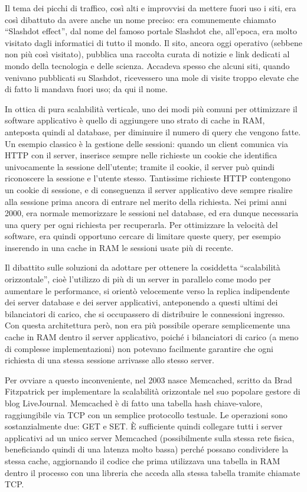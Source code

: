 Il tema dei picchi di traffico, così alti e improvvisi da mettere fuori uso i siti,
era così dibattuto da avere anche un nome preciso: era comunemente chiamato ``Slashdot
effect'', dal nome del famoso portale Slashdot che, all'epoca, era molto visitato dagli
informatici di tutto il mondo. Il sito, ancora oggi operativo (sebbene non più così
visitato), pubblica una raccolta curata di notizie e link dedicati al mondo della tecnologia
e delle scienza. Accadeva spesso che alcuni siti, quando venivano pubblicati su Slashdot,
ricevessero una mole di visite troppo elevate che di fatto li mandava fuori uso; da qui
il nome.

In ottica di pura scalabilità verticale, uno dei modi più comuni per ottimizzare il software
applicativo è quello di aggiungere uno strato di cache in RAM, anteposta quindi al database, per
diminuire il numero di query che vengono fatte. Un esempio classico è la gestione delle sessioni:
quando un client comunica via HTTP con il server, inserisce sempre nelle richieste un cookie che
identifica univocamente la sessione dell'utente; tramite il cookie, il server può quindi riconoscere
la sessione e l'utente stesso. Tantissime richieste HTTP contengono un cookie di sessione, e di
conseguenza il server applicativo deve sempre risalire alla sessione prima ancora di entrare nel
merito della richiesta. Nei primi anni 2000, era normale memorizzare le sessioni nel database, ed
era dunque necessaria una query per ogni richiesta per recuperarla. Per ottimizzare la velocità del
software, era quindi opportuno cercare di limitare queste query, per esempio inserendo in una cache
in RAM le sessioni usate più di recente.

Il dibattito sulle soluzioni da adottare per ottenere la cosiddetta ``scalabilità orizzontale'',
cioè l'utilizzo di più di un server in parallelo come modo per aumentare le performance, si orientò
velocemente verso la replica indipendente dei server database e dei server applicativi, anteponendo
a questi ultimi dei bilanciatori di carico, che si occupassero di distribuire le connessioni
ingresso. Con questa architettura però, non era più possibile operare semplicemente una cache in RAM
dentro il server applicativo, poiché i bilanciatori di carico (a meno di complesse implementazioni)
non potevano facilmente garantire che ogni richiesta di una stessa sessione arrivasse allo stesso
server.

Per ovviare a questo inconveniente, nel 2003 nasce Memcached, scritto da Brad Fitzpatrick per
implementare la scalabilità orizzontale nel suo popolare gestore di blog LiveJournal. Memcached è di
fatto una tabella hash chiave-valore, raggiungibile via TCP con un semplice protocollo testuale. Le
operazioni sono sostanzialmente due: GET e SET. È sufficiente quindi collegare tutti i server
applicativi ad un unico server Memcached (possibilmente sulla stessa rete fisica, beneficiando
quindi di una latenza molto bassa) perché possano condividere la stessa cache, aggiornando il codice
che prima utilizzava una tabella in RAM dentro il processo con una libreria che acceda alla stessa
tabella tramite chiamate TCP.

